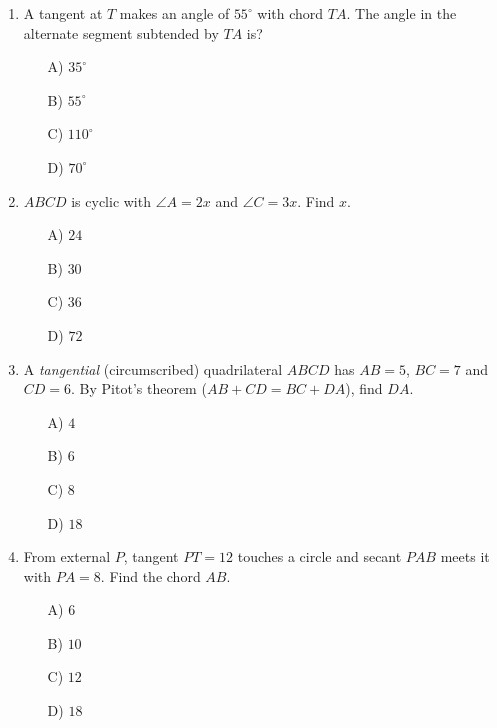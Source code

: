 \documentclass[11pt,a4paper]{article}
\begin{document}
\begin{enumerate}

\item A tangent at $T$ makes an angle of $55^\circ$ with chord $TA$. The angle in the alternate segment subtended by $TA$ is?
\begin{itemize}
\item[A)] $35^\circ$
\item[B)] $55^\circ$
\item[C)] $110^\circ$
\item[D)] $70^\circ$
\end{itemize}

\item $ABCD$ is cyclic with $\angle A=2x$ and $\angle C=3x$. Find $x$.
\begin{itemize}
\item[A)] $24$
\item[B)] $30$
\item[C)] $36$
\item[D)] $72$
\end{itemize}

\item A {\em tangential} (circumscribed) quadrilateral $ABCD$ has $AB=5$, $BC=7$ and $CD=6$. By Pitot's theorem ($AB+CD=BC+DA$), find $DA$.
\begin{itemize}
\item[A)] $4$
\item[B)] $6$
\item[C)] $8$
\item[D)] $18$
\end{itemize}

\item \begin{minipage}[t]{0.60\linewidth}
From external $P$, tangent $PT=12$ touches a circle and secant $PAB$ meets it with $PA=8$. Find the chord $AB$.
\begin{itemize}
\item[A)] $6$
\item[B)] $10$
\item[C)] $12$
\item[D)] $18$
\end{itemize}
\end{minipage}\hfill
\begin{minipage}[t]{0.36\linewidth}
\vspace{0pt}
\centering
{}
\end{minipage}


\end{enumerate}
\end{document}
